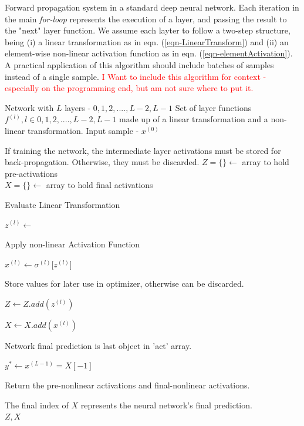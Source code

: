 \documentclass[12pt,letterpaper]{article}
\begin{document}
\begin{algorithm}[H]
\caption{Forward propagation system in a standard deep neural network. Each iteration in the main \textit{for-loop} represents the execution of a layer, and passing the result to the "next" layer function. We assume each layter to follow a two-step structure, being (i) a linear transformation as in eqn. (\ref{eqn-LinearTransform}) and (ii) an element-wise non-linear activation function as in eqn. (\ref{eqn-elementActivation}).  A practical application of this algorithm should include batches of samples instead of a single sample.
\textcolor{red}{I Want to include this algorithm for context - especially on the programming end, but am not sure where to put it. }}
\label{algFeedForward}

\begin{algorithmic}
\REQUIRE Network with $L$ layers - $0,1,2,....,L-2,L-1$
\REQUIRE Set of layer functions $f^{(l)}, l \in 0,1,2,....,L-2,L-1$ made up of a linear transformation and a non-linear transformation.
\REQUIRE Input sample - $x^{(0)}$

If training the network, the intermediate layer activations must be stored for back-propagation. Otherwise, they must be discarded.
$Z = \{\} \leftarrow$ array to hold pre-activations \\
$X = \{\} \leftarrow$ array to hold final activations \\

	\item Evaluate Linear Transformation
	\item $z^{(l)} \leftarrow$ 
	\item Apply non-linear Activation Function
	\item $x^{(l)} \leftarrow \sigma^{(l)} \big[ z^{(l)} \big]$ 
	\item Store values for later use in optimizer, otherwise can be discarded.
	\item $Z \leftarrow Z.add(z^{(l)})$
	\item $X \leftarrow X.add(x^{(l)})$
\ENDFOR

\item Network final prediction is last object in 'act' array.
\item $y^* \leftarrow x^{(L-1)} = X[-1]$
\item Return the pre-nonlinear activations and final-nonlinear activations.\\
\item The final index of $X$ represents the neural network's final prediction. \\
\RETURN $Z , X$


\end{algorithmic}
\end{algorithm}
\end{document}
